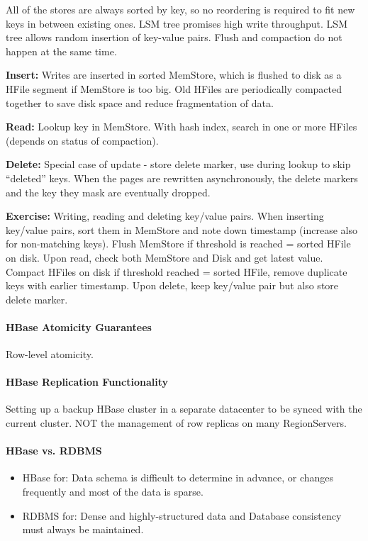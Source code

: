 All of the stores are always sorted by key, so no reordering is required to fit new keys in between existing ones. LSM tree promises high write throughput. LSM tree allows random insertion of key-value pairs. 	Flush and compaction do not happen at the same time.

\textbf{Insert:} Writes are inserted in sorted MemStore, which is flushed to disk as a HFile segment if MemStore is too big. Old HFiles are periodically compacted together to save disk space and reduce fragmentation of data.

\textbf{Read:} Lookup key in MemStore. With hash index, search in one or more HFiles (depends on status of compaction).

\textbf{Delete:} Special case of update - store delete marker, use during lookup to skip “deleted” keys. When the pages are rewritten asynchronously, the delete markers and the key they mask are eventually dropped.

\textbf{Exercise:} Writing, reading and deleting key/value pairs. When inserting key/value pairs, sort them in MemStore and note down timestamp (increase also for non-matching keys). Flush MemStore if threshold is reached = sorted HFile on disk. Upon read, check both MemStore and Disk and get latest value. Compact HFiles on disk if threshold reached = sorted HFile, remove duplicate keys with earlier timestamp. Upon delete, keep key/value pair but also store delete marker.


\paragraph{HBase Atomicity Guarantees}
Row-level atomicity.

\paragraph{HBase Replication Functionality}
Setting up a backup HBase cluster in a separate datacenter to be synced with the current cluster. NOT the management of row replicas on many RegionServers.

\paragraph{HBase vs. RDBMS}
\begin{itemize}
    \item HBase for: Data schema is difficult to determine in advance, or changes frequently and most of the data is sparse.
    \item RDBMS for: Dense and highly-structured data and Database consistency must always be maintained.
\end{itemize}

